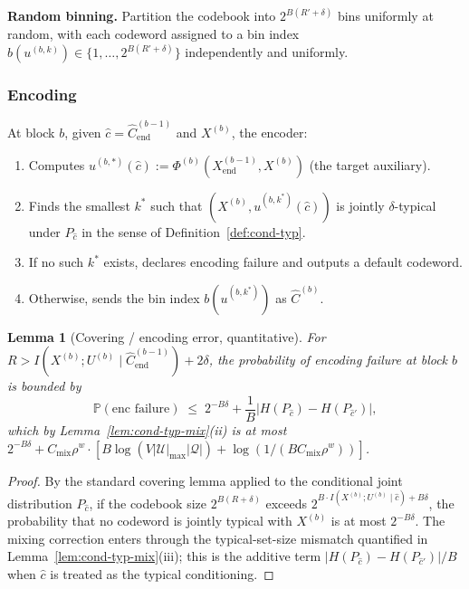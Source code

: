 \documentclass[11pt]{article}
\newcommand{\Prob}{\mathbb{P}}
\newcommand{\Chat}{\hat{C}}
\theoremstyle{plain}
\newtheorem{lemma}[theorem]{Lemma}
\theoremstyle{definition}
\theoremstyle{remark}
\begin{document}
\textbf{Random binning.} Partition the codebook into
$2^{B(R' + \delta)}$ bins uniformly at random, with each codeword
assigned to a bin index $b(u^{(b,k)}) \in \{1, \ldots, 2^{B(R'+\delta)}\}$
independently and uniformly.

\subsubsection{Encoding}

At block $b$, given $\hat c = \hat C^{(b-1)}_{\mathrm{end}}$ and
$X^{(b)}$, the encoder:
\begin{enumerate}[label=(\arabic*)]
\item Computes $u^{(b,*)}(\hat c) := \Phi^{(b)}(X^{(b-1)}_{\mathrm{end}}, X^{(b)})$
(the target auxiliary).
\item Finds the smallest $k^*$ such that $(X^{(b)}, u^{(b,k^*)}(\hat c))$
is jointly $\delta$-typical under $P_{\hat c}$ in the sense of
Definition~\ref{def:cond-typ}.
\item If no such $k^*$ exists, declares encoding failure and outputs
a default codeword.
\item Otherwise, sends the bin index $b(u^{(b,k^*)})$ as $\Chat^{(b)}$.
\end{enumerate}

\begin{lemma}[Covering / encoding error, quantitative]\label{lem:covering}
For $R > I(X^{(b)}; U^{(b)} \mid \hat C^{(b-1)}_{\mathrm{end}}) + 2\delta$,
the probability of encoding failure at block $b$ is bounded by
\[
\Prob(\text{enc failure})
\;\leq\;
2^{-B\delta} + \frac{1}{B}|H(P_{\hat c}) - H(P_{\hat c'})|,
\]
which by Lemma~\ref{lem:cond-typ-mix}(ii) is at most
$2^{-B\delta} + C_{\mathrm{mix}}\rho^w \cdot [B\log(V|\mathcal{U}|_{\max}|\mathcal{Q}|) + \log(1/(BC_{\mathrm{mix}}\rho^w))]$.
\end{lemma}

\begin{proof}
By the standard covering lemma \citep[Lemma 3.3]{elgamal2011network}
applied to the conditional joint distribution $P_{\hat c}$, if the
codebook size $2^{B(R+\delta)}$ exceeds
$2^{B \cdot I(X^{(b)}; U^{(b)} \mid \hat c) + B\delta}$, the probability
that no codeword is jointly typical with $X^{(b)}$ is at most
$2^{-B\delta}$. The mixing correction enters through the
typical-set-size mismatch quantified in Lemma~\ref{lem:cond-typ-mix}(iii);
this is the additive term $|H(P_{\hat c}) - H(P_{\hat c'})|/B$ when
$\hat c$ is treated as the typical conditioning.
\end{proof}
\end{document}
